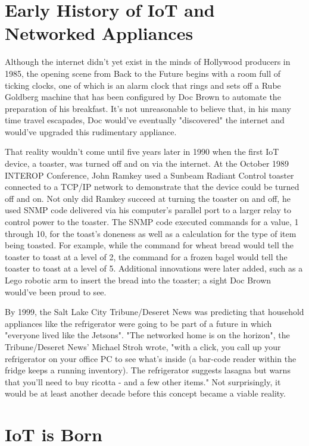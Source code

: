 \documentclass[sigconf]{acmart}
\begin{document}
\section{Early History of IoT and Networked Appliances}

Although the internet didn't yet exist in the minds of Hollywood producers in 1985, the opening scene from Back to the Future begins with a room full of ticking clocks, one of which is an alarm clock that rings and sets off a Rube Goldberg machine that has been configured by Doc Brown to automate the preparation of his breakfast. It's not unreasonable to believe that, in his many time travel escapades, Doc would've eventually "discovered" the internet and would've upgraded this rudimentary appliance. 
\par
That reality wouldn't come until five years later in 1990 when the first IoT device, a toaster, was turned off and on via the internet. At the October 1989 INTEROP Conference, John Ramkey used a Sunbeam Radiant Control toaster connected to a TCP/IP network to demonstrate that the device could be turned off and on\cite{Ramkey01}. Not only did Ramkey succeed at turning the toaster on and off, he used SNMP code delivered via his computer's parallel port to a larger relay to control power to the toaster. The SNMP code executed commands for a value, 1 through 10, for the toast's doneness as well as a calculation for the type of item being toasted. For example, while the command for wheat bread would tell the toaster to toast at a level of 2, the command for a frozen bagel would tell the toaster to toast at a level of 5. Additional innovations were later added, such as a Lego robotic arm to insert the bread into the toaster; a sight Doc Brown would've been proud to see.
\par
By 1999, the Salt Lake City Tribune/Deseret News was predicting that household appliances like the refrigerator were going to be part of a future in which "everyone lived like the Jetsons"\cite{Deseret1999}. "The networked home is on the horizon", the Tribune/Deseret News' Michael Stroh wrote, "with a click, you call up your refrigerator on your office PC to see what's inside (a bar-code reader within the fridge keeps a running inventory). The refrigerator suggests lasagna but warns that you'll need to buy ricotta - and a few other items."\cite{Deseret1999} Not surprisingly, it would be at least another decade before this concept became a viable reality. 

\section{IoT is Born}
\end{document}
